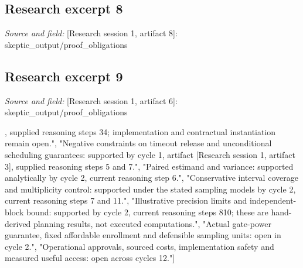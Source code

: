 \documentclass[11pt]{article}
\begin{document}
\subsection{Research excerpt 8}
\textit{Source and field: }[Research session 1, artifact 8]: skeptic\_output/proof\_obligations\par
["Local analytical obligation, supported in cycle 3 steps 2\textendash{}4: show aggregate usefulness cannot establish sensitive coverage and state the additional stratum premise.", "Local analytical obligation, supported in cycle 3 steps 5\textendash{}9: distinguish expectations from realized service and derive the fixed-plan cap threshold.", "Local analytical obligation, supported in cycle 3 steps 10\textendash{}11 and 14: scope dominance, liability accounting and the cost-per-useful-completion threshold.", "Unresolved objective obligation: establish documentation and price provenance, actual institutional permissions and the detailed cost evidence required for a campus-specific comparison.", "Unresolved implementation obligation: demonstrate that contractual bounds, mediation, reservation transitions and authorization ordering satisfy the declared premises.", "Unresolved study-design obligation: complete the requested bounded pilot, operational gates and uncertainty register; later measurements must remain distinct from this proposal."]

\subsection{Research excerpt 9}
\textit{Source and field: }[Research session 1, artifact 6]: skeptic\_output/proof\_obligations\par
["Conditional reservation invariant: supported by cycle 1, artifact [Research session 1, artifact 3], supplied reasoning steps 3\textendash{}4; implementation and contractual instantiation remain open.", "Negative constraints on timeout release and unconditional scheduling guarantees: supported by cycle 1, artifact [Research session 1, artifact 3], supplied reasoning steps 5 and 7.", "Paired estimand and variance: supported analytically by cycle 2, current reasoning step 6.", "Conservative interval coverage and multiplicity control: supported under the stated sampling models by cycle 2, current reasoning steps 7 and 11.", "Illustrative precision limits and independent-block bound: supported by cycle 2, current reasoning steps 8\textendash{}10; these are hand-derived planning results, not executed computations.", "Actual gate-power guarantee, fixed affordable enrollment and defensible sampling units: open in cycle 2.", "Operational approvals, sourced costs, implementation safety and measured useful access: open across cycles 1\textendash{}2."]
\end{document}
